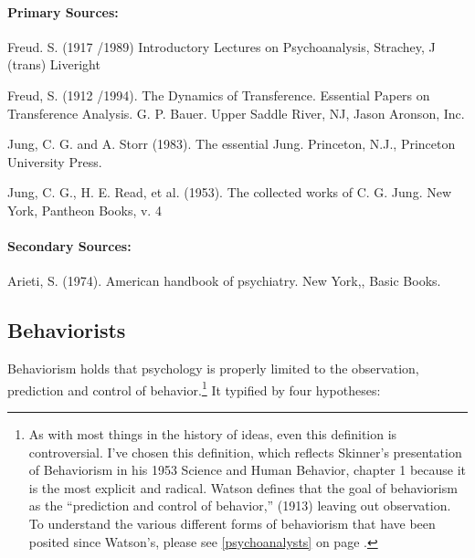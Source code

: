 \paragraph{Primary Sources:}
\label{primarysources:}

Freud. S. (1917 \slash  1989) Introductory Lectures on Psychoanalysis, Strachey, J (trans) Liveright

Freud, S. (1912 \slash  1994). The Dynamics of Transference. Essential Papers on Transference Analysis. G. P. Bauer. Upper Saddle River, NJ, Jason Aronson, Inc.

Jung, C. G. and A. Storr (1983). The essential Jung. Princeton, N.J., Princeton University Press.

Jung, C. G., H. E. Read, et al. (1953). The collected works of C. G. Jung. New York, Pantheon Books, v. 4

\paragraph{Secondary Sources:}
\label{secondarysources:}

Arieti, S. (1974). American handbook of psychiatry. New York,, Basic Books.

\subsection{Behaviorists}
\label{behaviorists}

Behaviorism holds that psychology is properly limited to the observation, prediction and control of behavior.\footnote{As with most things in the history of ideas, even this definition is controversial. I've chosen this definition, which reflects Skinner's presentation of Behaviorism in his 1953 Science and Human Behavior, chapter 1 because it is the most explicit and radical. Watson defines that the goal of behaviorism as the ``prediction and control of behavior,'' (1913) leaving out observation. To understand the various different forms of behaviorism that have been posited since Watson's, please see \ref{psychoanalysts} on page \pageref{psychoanalysts}.} It typified by four hypotheses:

